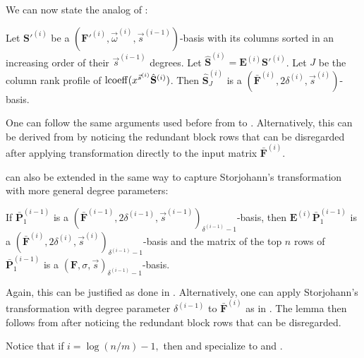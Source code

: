 We can now state the analog of : 
\begin{thm}
\label{thm:extractingOrderBasis}Let $\mathbf{S}'^{\left(i\right)}$
be a $(\mathbf{F}'^{\left(i\right)},\vec{\omega}^{\left(i\right)},\vec{s}^{\left(i-1\right)})$-basis
with its columns sorted in an increasing order of their $\vec{s}^{\left(i-1\right)}$
degrees. Let $\hat{\mathbf{S}}^{\left(i\right)}=\mathbf{E}^{\left(i\right)}\mathbf{S}'^{\left(i\right)}$.
Let $J$ be the column rank profile of $\operatorname{lcoeff}(x^{\vec{s}^{\left(i\right)}}\hat{\mathbf{S}}^{\left(i\right)})$.
Then $\hat{\mathbf{S}}_{J}^{\left(i\right)}$ is a $(\bar{\mathbf{F}}^{\left(i\right)},2\delta^{\left(i\right)},\vec{s}^{\left(i\right)})$-basis.\end{thm}
\begin{pf}
One can follow the same arguments used before from 
to . Alternatively, this
can be derived from  by
noticing the redundant block rows that can be disregarded after applying
transformation  directly to the
input matrix $\bar{\mathbf{F}}^{\left(i\right)}$. 
\end{pf}
 can also be extended in the same way
to capture Storjohann's transformation with more general degree parameters: 
\begin{lem}
\label{lem:linkStorjohanTransform}If $\bar{\mathbf{P}}_{1}^{\left(i-1\right)}$
is a $(\bar{\mathbf{F}}^{\left(i-1\right)},2\delta^{\left(i-1\right)},\vec{s}^{\left(i-1\right)})_{\delta^{\left(i-1\right)}-1}$-basis,
then $\mathbf{E}^{\left(i\right)}\bar{\mathbf{P}}_{1}^{\left(i-1\right)}$
is a $(\bar{\mathbf{F}}^{\left(i\right)},2\delta^{\left(i\right)},\vec{s}^{\left(i\right)})_{\delta^{\left(i-1\right)}-1}$-basis
and the matrix of the top $n$ rows of $\bar{\mathbf{P}}_{1}^{\left(i-1\right)}$
is a $(\mathbf{F},\sigma,\vec{s})_{\delta^{\left(i-1\right)}-1}$-basis.\end{lem}
\begin{pf}
Again, this can be justified as done in .
Alternatively, one can apply Storjohann's transformation with degree
parameter $\delta^{\left(i-1\right)}$ to $\bar{\mathbf{F}}^{\left(i\right)}$
as in . The lemma then
follows from  after noticing the redundant
block rows that can be disregarded. 
\end{pf}
Notice that if $i=\log\left(n/m\right)-1,$ then 
and  specialize to 
and . 
